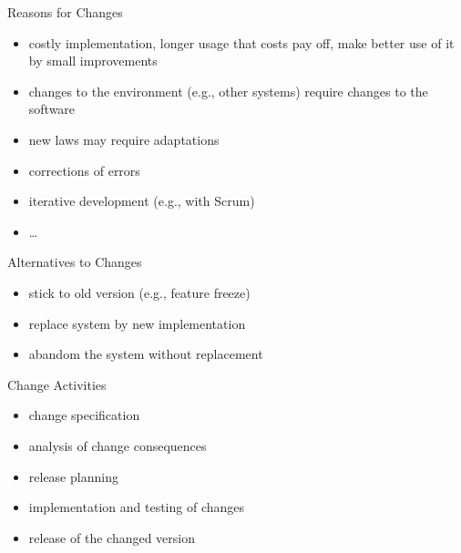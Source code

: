 \begin{frame}{\insertsubsection}
	\begin{fancycolumns}
		\begin{definition}{Reasons for Changes \mysource{\sommerville}}
			\begin{itemize}
				\item costly implementation, longer usage that costs pay off, make better use of it by small improvements
				\item changes to the environment (e.g., other systems) require changes to the software
				\item new laws may require adaptations
				\item corrections of errors
				\item iterative development (e.g., with Scrum)
				\item \ldots
			\end{itemize}
		\end{definition}
		\begin{note}{Alternatives to Changes}
			\begin{itemize}
				\item stick to old version (e.g., feature freeze)
				\item replace system by new implementation
				\item abandom the system without replacement
			\end{itemize}
		\end{note}
	\nextcolumn
		\begin{definition}{Change Activities \mysource{\sommerville}}
			\begin{itemize}
				\item change specification
				\item analysis of change consequences
				\item release planning
				\item implementation and testing of changes
				\item release of the changed version
			\end{itemize}
		\end{definition}
	\end{fancycolumns}
\end{frame}


